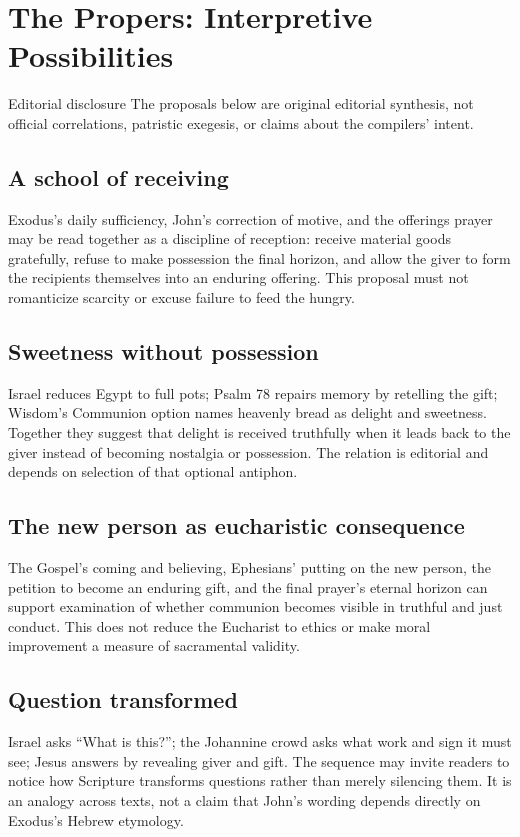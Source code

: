\section*{The Propers: Interpretive Possibilities}

\begin{studybox}{Editorial disclosure}
The proposals below are original editorial synthesis, not official
correlations, patristic exegesis, or claims about the compilers' intent.
\end{studybox}

\subsection*{A school of receiving}
Exodus's daily sufficiency, John's correction of motive, and the offerings
prayer may be read together as a discipline of reception: receive material
goods gratefully, refuse to make possession the final horizon, and allow the
giver to form the recipients themselves into an enduring offering. This
proposal must not romanticize scarcity
or excuse failure to feed the hungry.

\subsection*{Sweetness without possession}
Israel reduces Egypt to full pots; Psalm 78 repairs memory by retelling the
gift; Wisdom's Communion option names heavenly bread as delight and sweetness.
Together they suggest that delight is received truthfully when it leads back
to the giver instead of becoming nostalgia or possession. The relation is
editorial and depends on selection of that optional antiphon.

\subsection*{The new person as eucharistic consequence}
The Gospel's coming and believing, Ephesians' putting on the new person, the
petition to become an enduring gift, and the final prayer's eternal horizon
can support examination of whether communion becomes visible in truthful and
just conduct. This does not reduce
the Eucharist to ethics or make moral improvement a measure of sacramental
validity.

\subsection*{Question transformed}
Israel asks ``What is this?''; the Johannine crowd asks what work and sign it
must see; Jesus answers by revealing giver and gift. The sequence may invite
readers to notice how Scripture transforms questions rather than merely
silencing them. It is an analogy across texts, not a claim that John's wording
depends directly on Exodus's Hebrew etymology.

